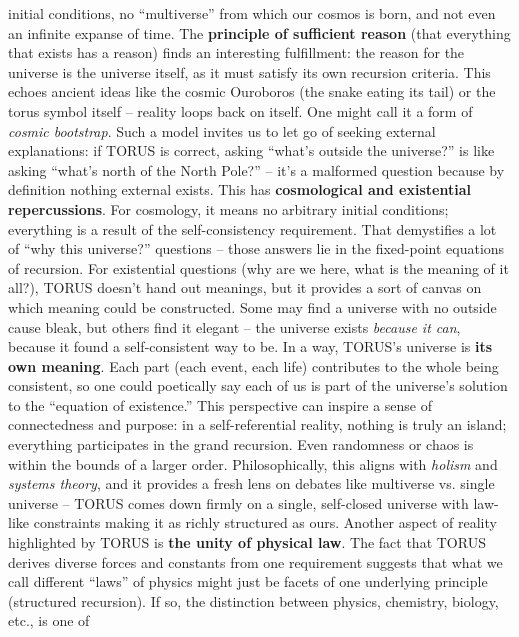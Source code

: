 \begin{itemize}
  initial conditions, no ``multiverse'' from which our cosmos is born,
  and not even an infinite expanse of time. The \textbf{principle of
  sufficient reason} (that everything that exists has a reason) finds an
  interesting fulfillment: the reason for the universe is the universe
  itself, as it must satisfy its own recursion criteria. This echoes
  ancient ideas like the cosmic Ouroboros (the snake eating its tail) or
  the torus symbol itself -- reality loops back on itself. One might
  call it a form of \emph{cosmic bootstrap}. Such a model invites us to
  let go of seeking external explanations: if TORUS is correct, asking
  ``what's outside the universe?'' is like asking ``what's north of the
  North Pole?'' -- it's a malformed question because by definition
  nothing external exists. This has \textbf{cosmological and existential
  repercussions}. For cosmology, it means no arbitrary initial
  conditions; everything is a result of the self-consistency
  requirement. That demystifies a lot of ``why this universe?''
  questions -- those answers lie in the fixed-point equations of
  recursion. For existential questions (why are we here, what is the
  meaning of it all?), TORUS doesn't hand out meanings, but it provides
  a sort of canvas on which meaning could be constructed. Some may find
  a universe with no outside cause bleak, but others find it elegant --
  the universe exists \emph{because it can}, because it found a
  self-consistent way to be. In a way, TORUS's universe is \textbf{its
  own meaning}. Each part (each event, each life) contributes to the
  whole being consistent, so one could poetically say each of us is part
  of the universe's solution to the ``equation of existence.'' This
  perspective can inspire a sense of connectedness and purpose: in a
  self-referential reality, nothing is truly an island; everything
  participates in the grand recursion. Even randomness or chaos is
  within the bounds of a larger order. Philosophically, this aligns with
  \emph{holism} and \emph{systems theory}, and it provides a fresh lens
  on debates like multiverse vs. single universe -- TORUS comes down
  firmly on a single, self-closed universe with law-like constraints
  making it as richly structured as ours. Another aspect of reality
  highlighted by TORUS is \textbf{the unity of physical law}. The fact
  that TORUS derives diverse forces and constants from one requirement
  suggests that what we call different ``laws'' of physics might just be
  facets of one underlying principle (structured recursion). If so, the
  distinction between physics, chemistry, biology, etc., is one of

\end{itemize}
